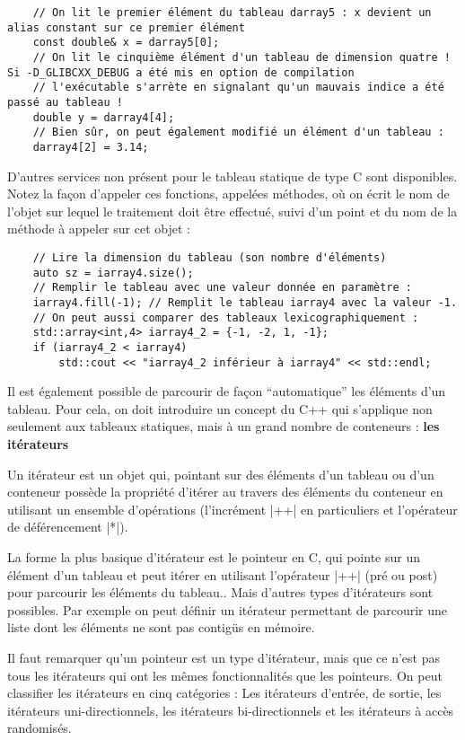 \begin{lstlisting}
    // On lit le premier élément du tableau darray5 : x devient un alias constant sur ce premier élément
    const double& x = darray5[0];
    // On lit le cinquième élément d'un tableau de dimension quatre ! Si -D_GLIBCXX_DEBUG a été mis en option de compilation
    // l'exécutable s'arrète en signalant qu'un mauvais indice a été passé au tableau !
    double y = darray4[4];
    // Bien sûr, on peut également modifié un élément d'un tableau :
    darray4[2] = 3.14;
\end{lstlisting}

D'autres services non présent pour le tableau statique de type C sont disponibles. Notez la façon d'appeler ces fonctions, appelées méthodes, où on écrit le nom de l'objet sur lequel le traitement doit être effectué, suivi d'un point et du nom de la méthode à appeler sur cet objet :

\begin{lstlisting}
    // Lire la dimension du tableau (son nombre d'éléments)
    auto sz = iarray4.size();
    // Remplir le tableau avec une valeur donnée en paramètre :
    iarray4.fill(-1); // Remplit le tableau iarray4 avec la valeur -1.
    // On peut aussi comparer des tableaux lexicographiquement :
    std::array<int,4> iarray4_2 = {-1, -2, 1, -1};
    if (iarray4_2 < iarray4) 
        std::cout << "iarray4_2 inférieur à iarray4" << std::endl;
\end{lstlisting}

Il est également possible de parcourir de façon ``automatique'' les éléments d'un tableau. Pour cela, on doit introduire un concept du C++ qui s'applique non seulement aux tableaux statiques, mais à un grand nombre de conteneurs : \textbf{les itérateurs}

Un itérateur est un objet qui, pointant sur des éléments d'un tableau ou d'un conteneur possède la propriété d'itérer au travers des éléments du conteneur en utilisant un ensemble d'opérations (l'incrément |++| en particuliers et l'opérateur de déférencement |*|). 

La forme la plus basique d'itérateur est le pointeur en C, qui pointe sur un élément d'un tableau et peut itérer en utilisant l'opérateur |++| (pré ou post) pour parcourir les éléments du tableau.. Mais d'autres types d'itérateurs sont possibles. Par exemple on peut définir un itérateur permettant de parcourir une liste dont les éléments ne sont pas contigüs en mémoire. 

Il faut remarquer qu'un pointeur est un type d'itérateur, mais que ce n'est pas tous les itérateurs qui ont les mêmes fonctionnalités que les pointeurs. On peut classifier les itérateurs en cinq catégories : Les itérateurs d'entrée, de sortie, les itérateurs uni-directionnels, les itérateurs bi-directionnels et les itérateurs à accès randomisés.

